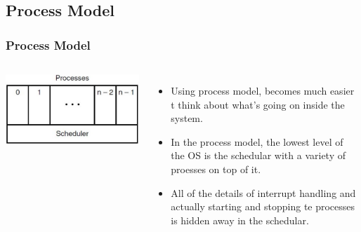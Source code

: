 \documentclass{beamer}
\begin{document}
\subsection{Process Model}
\begin{frame}
\frametitle{Process Model}
\begin{columns}[c]
\includegraphics[scale=0.35]{sched.png}
\begin{itemize}
\item Using process model, becomes much easier t think about what's going on inside the system.
\item In the process model, the lowest level of the OS is the {\color{red}schedular} with a variety of proesses on top of it.
\item All of the details of interrupt handling and actually starting and stopping te processes is hidden away in the {\color{red}schedular}.
\end{itemize}
\end{columns}
\end{frame}
\end{document}
